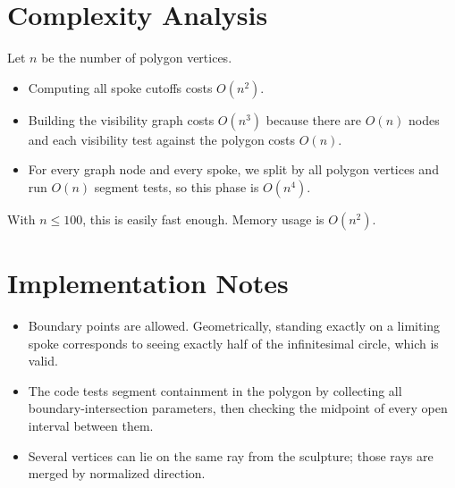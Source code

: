 \documentclass[11pt]{article}
\begin{document}
\section*{Complexity Analysis}

Let $n$ be the number of polygon vertices.

\begin{itemize}[leftmargin=*]
    \item Computing all spoke cutoffs costs $O(n^2)$.
    \item Building the visibility graph costs $O(n^3)$ because there are $O(n)$ nodes and each visibility
    test against the polygon costs $O(n)$.
    \item For every graph node and every spoke, we split by all polygon vertices and run $O(n)$ segment
    tests, so this phase is $O(n^4)$.
\end{itemize}

With $n \le 100$, this is easily fast enough. Memory usage is $O(n^2)$.

\section*{Implementation Notes}

\begin{itemize}[leftmargin=*]
    \item Boundary points are allowed. Geometrically, standing exactly on a limiting spoke corresponds to
    seeing exactly half of the infinitesimal circle, which is valid.
    \item The code tests segment containment in the polygon by collecting all boundary-intersection
    parameters, then checking the midpoint of every open interval between them.
    \item Several vertices can lie on the same ray from the sculpture; those rays are merged by normalized
    direction.
\end{itemize}
\end{document}

